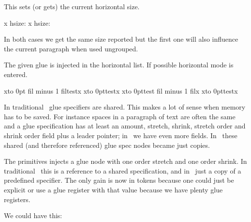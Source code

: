\startlines
\getbuffer
\stoplines

\stopoldprimitive

\startoldprimitive[title={\prm {hsize}}]

This sets (or gets) the current horizontal size.

\startbuffer
\hsize 40pt \vbox{x} hsize: \the{}
\vbox{\hsize 40pt x} hsize: \the{}
\stopbuffer

\typebuffer

In both cases we get the same size reported but the first one will also influence
the current paragraph when used ungrouped.

\startlines
\getbuffer
\stoplines

\stopoldprimitive

\startoldprimitive[title={\prm {hskip}}]

The given glue is injected in the horizontal list. If possible horizontal mode is
entered.

\stopoldprimitive

\startoldprimitive[title={\prm {hss}}]

\startbuffer
x\hbox to 0pt{ fil minus 1 fil\relax test}x
x\hbox to 0pt{\hss test}x
x\hbox to 0pt{test fil minus 1 fil\relax}x
x\hbox to 0pt{test\hss}x
\stopbuffer

In traditional \TEX\ glue specifiers are shared. This makes a lot of sense when
memory has to be saved. For instance spaces in a paragraph of text are often the
same and a glue specification has at least an amount, stretch, shrink, stretch
order and shrink order field plus a leader pointer; in \LUAMETATEX\ we have even
more fields. In \LUATEX\ these shared (and therefore referenced) glue spec nodes
became just copies.

\typebuffer

The  primitives injects a glue node with one order stretch and one
order shrink. In traditional \TEX\ this is a reference to a shared specification,
and in \LUATEX\ just a copy of a predefined specifier. The only gain is now in
tokens because one could just be explicit or use a glue register with that value
because we have plenty glue registers.

\startlines
\getbuffer
\stoplines

We could have this:

\starttyping
\permanent\protected\untraced{}
\stoptyping

